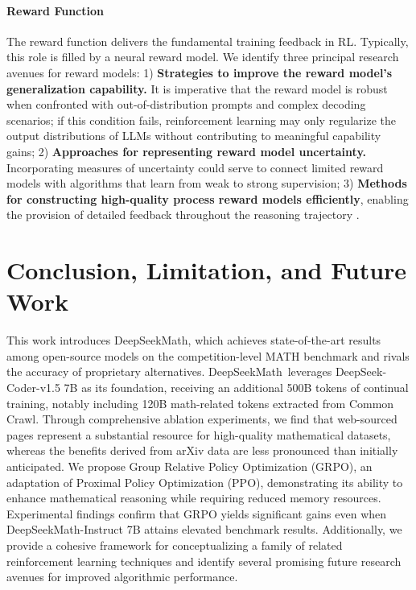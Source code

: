 \begin{itemize}[topsep=0pt]
\begin{itemize}[topsep=0pt]
\paragraph{Reward Function} The reward function delivers the fundamental training feedback in RL. Typically, this role is filled by a neural reward model. We identify three principal research avenues for reward models: 1) \textbf{Strategies to improve the reward model's generalization capability.} It is imperative that the reward model is robust when confronted with out-of-distribution prompts and complex decoding scenarios; if this condition fails, reinforcement learning may only regularize the output distributions of LLMs without contributing to meaningful capability gains; 2) \textbf{Approaches for representing reward model uncertainty.} Incorporating measures of uncertainty could serve to connect limited reward models with algorithms that learn from weak to strong supervision; 3) \textbf{Methods for constructing high-quality process reward models efficiently}, enabling the provision of detailed feedback throughout the reasoning trajectory \citep{lightman2023let,wang2023math}.

\section{Conclusion, Limitation, and Future Work}

This work introduces DeepSeekMath, which achieves state-of-the-art results among open-source models on the competition-level MATH benchmark and rivals the accuracy of proprietary alternatives. DeepSeekMath~leverages DeepSeek-Coder-v1.5 7B as its foundation, receiving an additional 500B tokens of continual training, notably including 120B math-related tokens extracted from Common Crawl. Through comprehensive ablation experiments, we find that web-sourced pages represent a substantial resource for high-quality mathematical datasets, whereas the benefits derived from arXiv data are less pronounced than initially anticipated. We propose Group Relative Policy Optimization (GRPO), an adaptation of Proximal Policy Optimization (PPO), demonstrating its ability to enhance mathematical reasoning while requiring reduced memory resources. Experimental findings confirm that GRPO yields significant gains even when DeepSeekMath-Instruct 7B attains elevated benchmark results. Additionally, we provide a cohesive framework for conceptualizing a family of related reinforcement learning techniques and identify several promising future research avenues for improved algorithmic performance.


\end{itemize}
\end{itemize}
